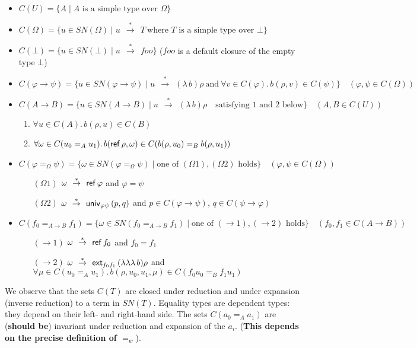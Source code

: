 \documentclass[10pt,a4paper]{article}
\newcommand{\set}[1]{\{#1\}}
\newcommand{\unphsi}{{\univ_{\varphi\psi}}}
\newcommand{\extfs}{{\ext_{f_0 f_1}}}
\newcommand{\rtr}{~~{\stackrel{*}{\to}}~~}
\newcommand{\foo}{\mathit{foo}}
\newcommand{\SN}{\mathit{SN}}
\newcommand{\Ref}{{\sf ref}}
\newcommand{\ext}{{\sf ext}}
\newcommand{\univ}{{\sf univ}}
\begin{document}
\begin{itemize}
\item $C(U) = \set{A \mid \text{$A$ is a simple type over $\Omega$}}$
\item $C(\Omega) = \set{u\in SN(\Omega) \mid u \rtr T
~\text{where $T$ is a simple type over $\bot$}}$
\item $C(\bot) = \set{u\in SN(\bot) \mid u \rtr \foo}$ 
($\foo$ is a default closure of the empty type $\bot$)
\item $C(\varphi\to\psi) = \set{u\in SN(\varphi\to\psi) \mid u \rtr (\lambda\,b)\rho 
~\text{and}~ \forall v\in C(\varphi).\,b(\rho,v) \in C(\psi)}\quad(\varphi,\psi \in C(\Omega))$
\item $C(A{\to}B) = \set{u\in SN(A{\to}B) \mid u \rtr (\lambda\,b)\rho \quad
\text{satisfying 1 and 2 below}}\quad(A,B \in C(U))$
  \begin{enumerate}
  \item $\forall u\in C(A).\,b(\rho,u) \in C(B)$
  \item $\forall \omega\in C(u_0 =_A u_1).\,b(\Ref\,\rho,\omega) 
        \in C(b(\rho,u_0) =_B b(\rho,u_1))$
  \end{enumerate}
\item $C(\varphi =_\Omega \psi) = \set{\omega\in SN(\varphi =_\Omega \psi) \mid 
\text{one of $(\Omega1),(\Omega2)$ holds}}\quad(\varphi,\psi \in C(\Omega))$ 
  \begin{enumerate}
  \item[$(\Omega1)$] $\omega \rtr \Ref\,\varphi$ and $\varphi =  \psi$
  \item[$(\Omega2)$] $\omega \rtr \unphsi\,(p,q)$ and $p\in C(\varphi\to\psi)$, $q\in C(\psi\to\varphi)$
  \end{enumerate}
\item $C(f_0 =_{A{\to}B} f_1) = \set{\omega\in SN(f_0 =_{A{\to}B} f_1) \mid 
\text{one of $({\to}1),({\to}2)$ holds}}\quad(f_0,f_1 \in C(A{\to}B))$
  \begin{enumerate}
  \item[$({\to}1)$] $\omega \rtr \Ref\,f_0$ and $f_0 = f_1$
  \item[$({\to}2)$] $\omega \rtr \extfs\,(\lambda\lambda\lambda\,b)\rho$ and
      $\forall\mu\in C(u_0 =_A u_1).\,b(\rho,u_0,u_1,\mu) \in C(f_0 u_0 =_B f_1 u_1)$
  \end{enumerate}
\end{itemize}

We observe that the sets $C(T)$ are closed under reduction and
under expansion (inverse reduction) to a term in $\SN(T)$.
Equality types are dependent types: they depend on their left- and right-hand side.
The sets $C(a_0 =_A a_1)$ are ({\bf should be}) invariant under reduction and expansion
of the $a_i$. ({\bf This depends on the precise definition of $=_w$}).
\end{document}
